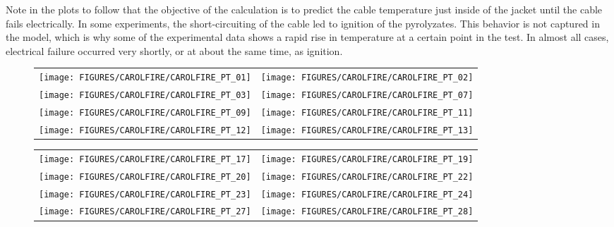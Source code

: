 Note in the plots to follow that the objective of the calculation is to predict the cable temperature just inside of the
jacket until the cable fails electrically. In some experiments, the short-circuiting of the cable led to ignition of the
pyrolyzates. This behavior is not captured in the model, which is why some of the experimental data shows a rapid rise in
temperature at a certain point in the test. In almost all cases, electrical failure occurred very shortly, or at about the
same time, as ignition.

\newpage

\begin{figure}[p]
\begin{tabular*}{\textwidth}{l@{\extracolsep{\fill}}r}
\texttt{[image: FIGURES/CAROLFIRE/CAROLFIRE\_PT\_01]} &
\texttt{[image: FIGURES/CAROLFIRE/CAROLFIRE\_PT\_02]} \\
\texttt{[image: FIGURES/CAROLFIRE/CAROLFIRE\_PT\_03]} &
\texttt{[image: FIGURES/CAROLFIRE/CAROLFIRE\_PT\_07]} \\
\texttt{[image: FIGURES/CAROLFIRE/CAROLFIRE\_PT\_09]} &
\texttt{[image: FIGURES/CAROLFIRE/CAROLFIRE\_PT\_11]} \\
\texttt{[image: FIGURES/CAROLFIRE/CAROLFIRE\_PT\_12]} &
\texttt{[image: FIGURES/CAROLFIRE/CAROLFIRE\_PT\_13]}
\end{tabular*}
\label{CAROLFIRE_Thermoset_1}
\end{figure}

\begin{figure}[p]
\begin{tabular*}{\textwidth}{l@{\extracolsep{\fill}}r}
\texttt{[image: FIGURES/CAROLFIRE/CAROLFIRE\_PT\_17]} &
\texttt{[image: FIGURES/CAROLFIRE/CAROLFIRE\_PT\_19]} \\
\texttt{[image: FIGURES/CAROLFIRE/CAROLFIRE\_PT\_20]} &
\texttt{[image: FIGURES/CAROLFIRE/CAROLFIRE\_PT\_22]} \\
\texttt{[image: FIGURES/CAROLFIRE/CAROLFIRE\_PT\_23]} &
\texttt{[image: FIGURES/CAROLFIRE/CAROLFIRE\_PT\_24]} \\
\texttt{[image: FIGURES/CAROLFIRE/CAROLFIRE\_PT\_27]} &
\texttt{[image: FIGURES/CAROLFIRE/CAROLFIRE\_PT\_28]}
\end{tabular*}
\label{CAROLFIRE_Thermoset_2}
\end{figure}

